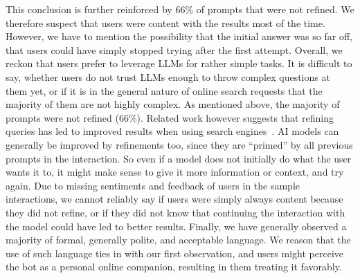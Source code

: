 This conclusion is further reinforced by 66\% of prompts that were not refined.
We therefore suspect that users were content with the results most of the time.
However, we have to mention the possibility that the initial answer was so far off,
that users could have simply stopped trying after the first attempt.
Overall, we reckon that users prefer to leverage LLMs for rather simple tasks.
It is difficult to say, whether users do not trust LLMs enough to throw complex questions at
them yet, or if it is in the general nature of online search requests that the majority of
them are not highly complex.
As mentioned above, the majority of prompts were not refined (66\%).
Related work however suggests that refining queries has led to improved results when using search
engines~\cite{huang_analyzing_2009}.
AI models can generally be improved by refinements too, since they are “primed” by all previous
prompts in the interaction.
So even if a model does not initially do what the user wants it to, it might make
sense to give it more information or context, and try again.
Due to missing sentiments and feedback of users in the sample interactions, we cannot reliably say
if users were simply always content because they did not refine, or if they did not know that
continuing the interaction with the model could have led to better results.
Finally, we have generally observed a majority of formal, generally polite, and acceptable language.
We reason that the use of such language ties in with our first observation, and users might perceive
the bot as a personal online companion, resulting in them treating it favorably.

